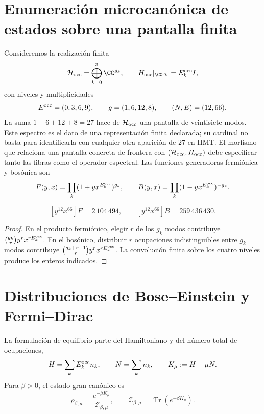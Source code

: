 \section{Enumeración microcanónica de estados sobre una pantalla finita}

Consideremos la realización finita
\[
 \mathcal H_{\rm occ}=\bigoplus_{k=0}^{3}\CC^{g_k},
 \qquad
 H_{\rm occ}|_{\CC^{g_k}}=E_k^{\rm occ} I,
\]
con niveles y multiplicidades
\[
 E^{\rm occ}=(0,3,6,9),\qquad g=(1,6,12,8),
 \qquad(N,E)=(12,66).
\]
La suma \(1+6+12+8=27\) hace de \(\mathcal H_{\rm occ}\) una pantalla de
veintisiete modos. Este espectro es el dato de una representación finita
declarada; su cardinal no basta para identificarla con cualquier otra
aparición de \(27\) en HMT\@. El morfismo que relaciona una pantalla concreta
de frontera con \((\mathcal H_{\rm occ},H_{\rm occ})\) debe especificar tanto
las fibras como el operador espectral.
Las funciones generadoras fermiónica y bosónica son
\[
 F(y,x)=\prod_k(1+yx^{E_k^{\rm occ}})^{g_k},
 \qquad
 B(y,x)=\prod_k(1-yx^{E_k^{\rm occ}})^{-g_k}.
\]

\begin{proposition}
\label{prop:cardinalidades-microcanonicas}
\[
 [y^{12}x^{66}]F=2\,104\,494,
 \qquad
 [y^{12}x^{66}]B=259\,436\,430.
\]
\end{proposition}
\begin{proof}
En el producto fermiónico, elegir \(r\) de los \(g_k\) modos contribuye
\(\binom{g_k}{r}y^rx^{rE_k^{\rm occ}}\). En el bosónico, distribuir \(r\)
ocupaciones indistinguibles entre \(g_k\) modos contribuye
\(\binom{g_k+r-1}{r}y^rx^{rE_k^{\rm occ}}\). La convolución finita sobre los
cuatro niveles produce los enteros indicados.
\end{proof}

\section{Distribuciones de Bose--Einstein y Fermi--Dirac}

La formulación de equilibrio parte del Hamiltoniano y del número total de
ocupaciones,
\begin{equation}
 H=\sum_kE_k^{\rm occ} n_k,
 \qquad
 N=\sum_k n_k,
 \qquad
 K_\mu:=H-\mu N.
 \label{eq:hamiltoniano-gran-canonico-rev3}
\end{equation}
Para \(\beta>0\), el estado gran canónico es
\begin{equation}
 \rho_{\beta,\mu}
 =\frac{e^{-\beta K_\mu}}{\mathcal Z_{\beta,\mu}},
 \qquad
 \mathcal Z_{\beta,\mu}
 =\operatorname{Tr}(e^{-\beta K_\mu}).
 \label{eq:estado-gran-canonico-rev3}
\end{equation}

